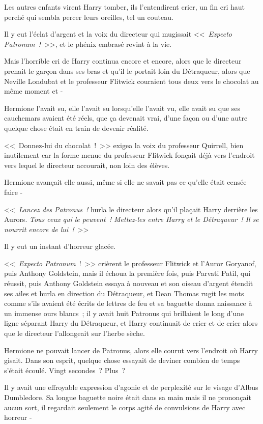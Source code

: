 \later

Les autres enfants virent Harry tomber, ils l'entendirent crier, un fin cri haut perché qui sembla percer leurs oreilles, tel un couteau.

Il y eut l'éclat d'argent et la voix du directeur qui mugissait <<~\emph{Expecto Patronum~!}~>>, et le phénix embrasé revint à la vie.

Mais l'horrible cri de Harry continua encore et encore, alors que le directeur prenait le garçon dans ses bras et qu'il le portait loin du Détraqueur, alors que Neville Londubat et le professeur Flitwick couraient tous deux vers le chocolat au même moment et -

Hermione l'avait su, elle l'avait su lorsqu'elle l'avait vu, elle avait su que ses cauchemars avaient été réels, que ça devenait vrai, d'une façon ou d'une autre quelque chose était en train de devenir réalité.

<<~Donnez-lui du chocolat~!~>> exigea la voix du professeur Quirrell, bien inutilement car la forme menue du professeur Flitwick fonçait déjà vers l'endroit vers lequel le directeur accourait, non loin des élèves.

Hermione avançait elle aussi, même si elle ne savait pas ce qu'elle était censée faire -

<<~\emph{Lancez des Patronus~!} hurla le directeur alors qu'il plaçait Harry derrière les Aurors. \emph{Tous ceux qui le peuvent~! Mettez-les entre Harry et le Détraqueur~! Il se nourrit encore de lui~!}~>>

Il y eut un instant d'horreur glacée.

<<~\emph{Expecto Patronum}~!~>> crièrent le professeur Flitwick et l'Auror Goryanof, puis Anthony Goldstein, mais il échoua la première fois, puis Parvati Patil, qui réussit, puis Anthony Goldstein essaya à nouveau et son oiseau d'argent étendit ses ailes et hurla en direction du Détraqueur, et Dean Thomas rugit les mots comme s'ils avaient été écrits de lettres de feu et sa baguette donna naissance à un immense ours blancs~; il y avait huit Patronus qui brillaient le long d'une ligne séparant Harry du Détraqueur, et Harry continuait de crier et de crier alors que le directeur l'allongeait sur l'herbe sèche.

Hermione ne pouvait lancer de Patronus, alors elle courut vers l'endroit où Harry gisait. Dans son esprit, quelque chose essayait de deviner combien de temps s'était écoulé. Vingt secondes~? Plus~?

Il y avait une effroyable expression d'agonie et de perplexité sur le visage d'Albus Dumbledore. Sa longue baguette noire était dans sa main mais il ne prononçait aucun sort, il regardait seulement le corps agité de convulsions de Harry avec horreur -

